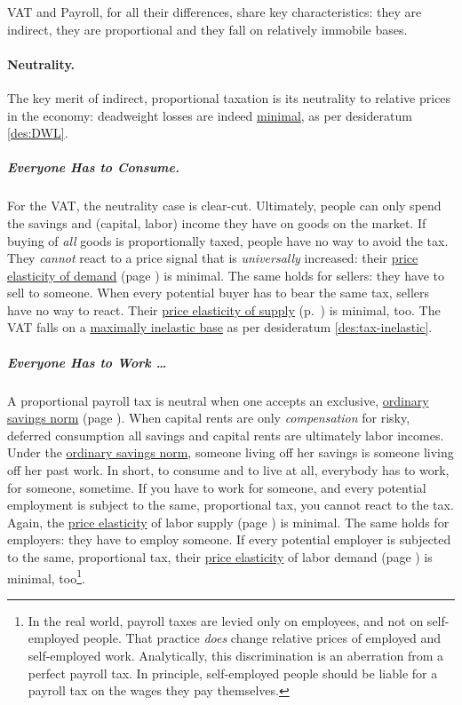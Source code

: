 VAT and Payroll, for all their differences, share key characteristics: they are indirect, they are proportional and they fall on relatively immobile bases.  %

\paragraph{Neutrality.} The key merit of indirect, proportional taxation is its neutrality to relative prices in the economy: deadweight losses are indeed \hyperref[des:DWL]{minimal}, as per desideratum \ref{des:DWL}. 

\subparagraph{Everyone Has to Consume.} For the VAT, the neutrality case is clear-cut. Ultimately, people can only spend the savings and (capital, labor) income they have on goods on the market. If buying of \emph{all} goods is proportionally taxed, people have no way to avoid the tax. They \emph{cannot} react to a price signal that is \emph{universally} increased: their \hyperref[eq:PED]{price elasticity of demand} (page \pageref{eq:PED}) is minimal. The same holds for sellers: they have to sell to someone. When every potential buyer has to bear the same tax, sellers have no way to react. Their \hyperref[eq:PES]{price elasticity of supply} (p.~\pageref{eq:PES}) is minimal, too. The VAT falls on a \hyperref[des:tax-inelastic]{maximally inelastic base} as per desideratum \ref{des:tax-inelastic}. 

\subparagraph{Everyone Has to Work \ldots} A proportional payroll tax is neutral when one accepts an exclusive, \hyperref[sec:OSN]{ordinary savings norm} (page \pageref{sec:OSN}). When capital rents are only \emph{compensation} for risky, deferred consumption all savings and capital rents are ultimately labor incomes. Under the \hyperref[sec:OSN]{ordinary savings norm}, someone living off her savings is someone living off her past work. In short, to consume and to live at all, everybody has to work, for someone, sometime. If you have to work for someone, and every potential employment is subject to the same, proportional tax, you cannot react to the tax. Again, the \hyperref[eq:PES]{price elasticity} of labor supply (page \pageref{eq:PES}) is minimal. The same holds for employers: they have to employ someone. If every potential employer is subjected to the same, proportional tax, their \hyperref[eq:PES]{price elasticity} of labor demand (page \pageref{eq:PES}) is minimal, too\footnote{In the real world, payroll taxes are levied only on employees, and not on self-employed people. That practice \emph{does} change relative prices of employed and self-employed work. Analytically, this discrimination is an aberration from a perfect payroll tax. In principle, self-employed people should be liable for a payroll tax on the wages they pay themselves.}.

